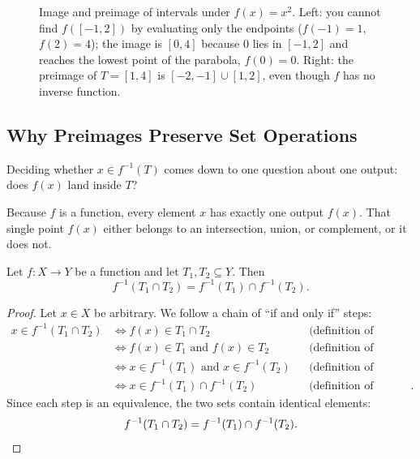 \begin{figure}[htbp]
\caption{Image and preimage of intervals under $f(x) = x^2$. Left: you cannot find $f([-1, 2])$ by evaluating only the endpoints ($f(-1) = 1$, $f(2) = 4$); the image is $[0, 4]$ because $0$ lies in $[-1, 2]$ and reaches the lowest point of the parabola, $f(0) = 0$. Right: the preimage of $T = [1, 4]$ is $[-2, -1] \cup [1, 2]$, even though $f$ has no inverse function.}
\label{fig:img-intervals}
\end{figure}

\subsection{Why Preimages Preserve Set Operations}

Deciding whether $x \in f^{-1}(T)$ comes down to one question about one output: does $f(x)$ land inside $T$?

Because $f$ is a function, every element $x$ has exactly one output $f(x)$. That single point $f(x)$ either belongs to an intersection, union, or complement, or it does not.

\begin{theorem}
Let $f: X \to Y$ be a function and let $T_1, T_2 \subseteq Y$. Then
\[
f^{-1}(T_1 \cap T_2) = f^{-1}(T_1) \cap f^{-1}(T_2).
\]
\end{theorem}

\begin{proof}
Let $x \in X$ be arbitrary. We follow a chain of ``if and only if'' steps:
\begin{align*}
x \in f^{-1}(T_1 \cap T_2) 
&\iff f(x) \in T_1 \cap T_2 && \text{(definition of preimage)} \\
&\iff f(x) \in T_1 \text{ and } f(x) \in T_2 && \text{(definition of intersection)} \\
&\iff x \in f^{-1}(T_1) \text{ and } x \in f^{-1}(T_2) && \text{(definition of preimage)} \\
&\iff x \in f^{-1}(T_1) \cap f^{-1}(T_2) && \text{(definition of intersection)}.
\end{align*}
Since each step is an equivalence, the two sets contain identical elements:
\[
f^{-1}(T_1 \cap T_2) = f^{-1}(T_1) \cap f^{-1}(T_2). \qedhere
\]
\end{proof}

